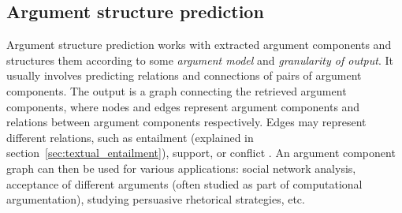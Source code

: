 

\subsection{Argument structure prediction}

Argument structure prediction works with extracted argument components
and structures them according to some \emph{argument model} and 
\emph{granularity of output}. It usually involves predicting 
relations and connections of pairs of argument components. The output
is a graph connecting the retrieved argument components, where nodes and 
edges represent argument components and relations between argument components
respectively. Edges may represent different relations, such as entailment 
(explained in section~\ref{sec:textual_entailment}), support, or conflict
\citep{lippi2016argumentation}. An argument component graph can then be used
for various applications: social network analysis, acceptance of different 
arguments (often studied as part of computational argumentation), studying 
persuasive rhetorical strategies, etc.


